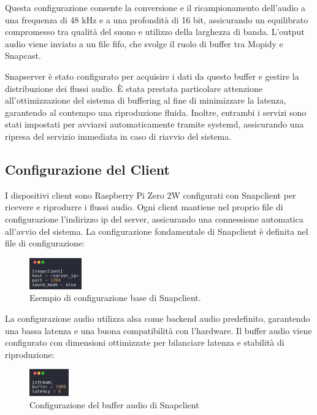 Questa configurazione consente la conversione e il ricampionamento dell'audio a una frequenza di 48 kHz e a una profondità di 16 bit, assicurando un equilibrato compromesso tra qualità del suono e utilizzo della larghezza di banda. L'output audio viene inviato a un file \gls{fifo}, che svolge il ruolo di buffer tra Mopidy e Snapcast.

Snapserver è stato configurato per acquisire i dati da questo buffer e gestire la distribuzione dei flussi audio. È stata prestata particolare attenzione all'ottimizzazione del sistema di buffering al fine di minimizzare la latenza, garantendo al contempo una riproduzione fluida. Inoltre, entrambi i servizi sono stati impostati per avviarsi automaticamente tramite systemd, assicurando una ripresa del servizio immediata in caso di riavvio del sistema.

\subsection{Configurazione del Client}

I dispositivi client sono Raspberry Pi Zero 2W configurati con Snapclient per ricevere e riprodurre i flussi audio. Ogni client mantiene nel proprio file di configurazione l'indirizzo \gls{ip} del server, assicurando una connessione automatica all'avvio del sistema. La configurazione fondamentale di Snapclient è definita nel file di configurazione:

\begin{figure}[H]
    \centering
    \includegraphics[width=0.2\textwidth]{Chapters/Figures/snap_client_example.png}
    \caption{\small Esempio di configurazione base di Snapclient.} 
    \label{fig:snap_client_example}
\end{figure}

La configurazione audio utilizza \gls{alsa} come backend audio predefinito, garantendo una bassa latenza e una buona compatibilità con l'hardware. Il buffer audio viene configurato con dimensioni ottimizzate per bilanciare latenza e stabilità di riproduzione:

\begin{figure}[H]
    \centering
    \includegraphics[width=0.15\textwidth]{Chapters/Figures/snap_buffer_audio.png}
    \caption{\small Configurazione del buffer audio di Snapclient} 
    \label{fig:snap_buffer_audio}
\end{figure}

